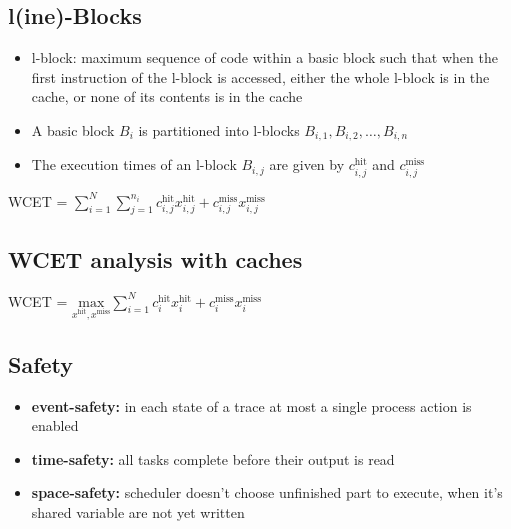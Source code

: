 \documentclass[german]{latex4ei/latex4ei_sheet}
\begin{document}
\begin{sectionbox}
\subsection{l(ine)-Blocks}
\begin{itemize}
\item l-block: maximum sequence of code within a basic block such that when the first instruction of the l-block is accessed, either the whole l-block is in the cache, or none of its contents is in the cache
\item A basic block $B_i$ is partitioned into l-blocks $B_{i,1}, B_{i,2},\ldots, B_{i,n}$
\item The execution times of an l-block $B_{i,j}$ are given by $c^\text{hit}_{i,j}$ and $c^\text{miss}_{i,j}$
\end{itemize}
\begin{emphbox}
	WCET = $\sum\limits_{i=1}^N\sum\limits_{j=1}^{n_i} c_{i,j}^\text{hit}x_{i,j}^\text{hit} + c_{i,j}^\text{miss}x_{i,j}^\text{miss}$
\end{emphbox}

\subsection{WCET analysis with caches}
\begin{emphbox}
	WCET = $\underset{x^\text{hit}, x^\text{miss}}{\text{max}}\sum\limits_{i=1}^N c_i^\text{hit}x_i^\text{hit} + c_i^\text{miss}x_i^\text{miss}$
\end{emphbox}

\subsection{Safety}
\begin{itemize}
\item\textbf{event-safety:} in each state of a trace at most a single process action is enabled
\item\textbf{time-safety:} all tasks complete before their output is read
\item\textbf{space-safety:} scheduler doesn't choose unfinished part to execute, when it's shared variable are not yet written
\end{itemize}
\end{sectionbox}
\end{document}
